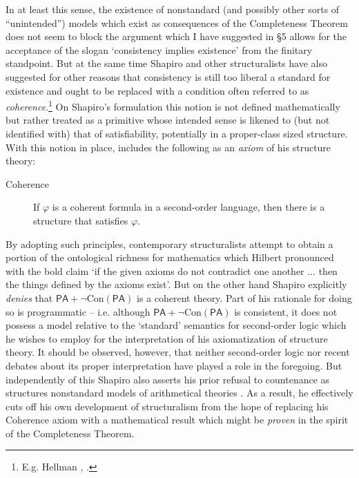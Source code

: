 \documentclass[11pt,fleqn,leqno]{article}
\def\phi{\varphi}
\begin{document}
In at least this sense, the existence of nonstandard (and possibly other sorts of ``unintended'') models which exist as consequences of the Completeness Theorem does not seem to block the argument which I have suggested in \S 5 allows for the acceptance of the slogan `consistency implies existence' from the finitary standpoint.  But at the same time Shapiro and other structuralists have also suggested for other reasons that consistency is still too liberal a standard for existence and ought to be replaced with a condition often referred to as \textsl{coherence}.\footnote{E.g. Hellman \citeyearpar[p. 19]{Hellman1989}, \citeyearpar[p. 556]{Hellman2005}.}    On Shapiro's \citeyearpar[pp. 135-136]{Shapiro1997} formulation this notion is not defined mathematically but rather treated as a primitive whose intended sense is likened to (but not identified with) that of satisfiability, potentially in a proper-class sized structure.   With this notion in place, \citet[p. 95]{Shapiro1997} includes the following as an \textsl{axiom} of his structure theory: 
\begin{description}
\item[Coherence] If $\phi$ is a coherent formula in a second-order language, then there is a structure that satisfies $\phi$. 
\end{description}

By adopting such principles, contemporary structuralists attempt to obtain a portion of the ontological richness for mathematics which Hilbert pronounced with the bold claim `if the given axioms do not contradict one another $\ldots$ then the things defined by the axioms exist'.   But on the other hand Shapiro explicitly \textsl{denies} that $\mathsf{PA} + \neg \mathrm{Con}(\mathsf{PA})$ is a coherent theory.   Part of his rationale for doing so is programmatic --  i.e. although $\mathsf{PA} + \neg \mathrm{Con}(\mathsf{PA})$ is consistent, it does not possess a model relative to the `standard' semantics for second-order logic which he wishes to employ for the interpretation of his axiomatization of structure theory.   It should be observed, however, that neither second-order logic nor recent debates about its proper interpretation have played a role in the foregoing.  But independently of this Shapiro also asserts his prior refusal to countenance  as structures nonstandard models of arithmetical theories \citeyearpar[p. 133]{Shapiro1997}.   As a result, he effectively cuts off his own development of structuralism from the hope of replacing his Coherence axiom with a mathematical result which might be \textsl{proven} in the spirit of the Completeness Theorem.
\end{document}

